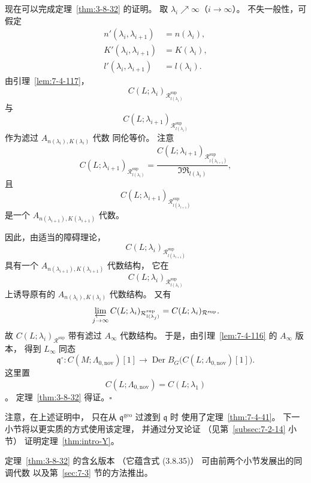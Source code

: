 现在可以完成定理~\ref{thm:3-8-32} 的证明。
取 $\lambda_i\nearrow\infty$（$i\to\infty$）。
不失一般性，可假定
\[
\begin{aligned}
n'(\lambda_i,\lambda_{i+1})&=n(\lambda_i),\\
K'(\lambda_i,\lambda_{i+1})&=K(\lambda_i),\\
l'(\lambda_i,\lambda_{i+1})&=l(\lambda_i).
\end{aligned}
\]
由引理~\ref{lem:7-4-117}，
\[
C(L;\lambda_i)_
{\mathcal R^{\mathrm{sup}}_{l(\lambda_i)}}
\]
与
\[
C(L;\lambda_{i+1})_
{\mathcal R^{\mathrm{sup}}_{l(\lambda_i)}}
\]
作为滤过
$A_{n(\lambda_i),K(\lambda_i)}$ 代数
同伦等价。
注意
\[
C(L;\lambda_{i+1})_
{\mathcal R^{\mathrm{sup}}_{l(\lambda_i)}}
=
\frac{
C(L;\lambda_{i+1})_
{\mathcal R^{\mathrm{sup}}_{l(\lambda_{i+1})}}
}{
\mathfrak{IR}_{l(\lambda_i)}
},
\]
且
\[
C(L;\lambda_{i+1})_
{\mathcal R^{\mathrm{sup}}_{l(\lambda_{i+1})}}
\]
是一个
$A_{n(\lambda_{i+1}),K(\lambda_{i+1})}$ 代数。

因此，由适当的障碍理论，
\[
C(L;\lambda_i)_
{\mathcal R^{\mathrm{sup}}_{l(\lambda_{i+1})}}
\]
具有一个
$A_{n(\lambda_{i+1}),K(\lambda_{i+1})}$
代数结构，
它在
\[
C(L;\lambda_i)_
{\mathcal R^{\mathrm{sup}}_{l(\lambda_i)}}
\]
上诱导原有的
$A_{n(\lambda_i),K(\lambda_i)}$ 代数结构。
又有
\[
\varprojlim_{j\to\infty}
C(L;\lambda_i)_
{\mathcal R^{\mathrm{sup}}_{l(\lambda_j)}}
=
C(L;\lambda_i)_{\mathcal R^{\mathrm{sup}}}.
\]
故
$C(L;\lambda_i)_{\mathcal R^{\mathrm{sup}}}$
带有滤过 $A_\infty$ 代数结构。
于是，由引理~\ref{lem:7-4-116}
的 $A_\infty$ 版本，
得到 $L_\infty$ 同态
\[
\mathfrak q^{\circ}:
C(M;\Lambda_{0,\mathrm{nov}})[1]
\longrightarrow
\operatorname{Der}B_G
\bigl(C(L;\Lambda_{0,\mathrm{nov}})[1]\bigr).
\]
这里置
\[
C(L;\Lambda_{0,\mathrm{nov}})
=C(L;\lambda_1)
\]
。
定理~\ref{thm:3-8-32} 得证。\hfill$\square$

注意，在上述证明中，
只在从 $\mathfrak q^{\mathrm{geo}}$
过渡到 $\mathfrak q$ 时
使用了定理~\ref{thm:7-4-41}。
下一小节将以更实质的方式使用该定理，
并通过分叉论证
（见第~\ref{subsec:7-2-14} 小节）
证明定理~\ref{thm:intro-Y}。

定理~\ref{thm:3-8-32} 的含幺版本
（它蕴含式 (3.8.35)）
可由前两个小节发展出的同调代数
以及第~\ref{sec:7-3} 节的方法推出。

